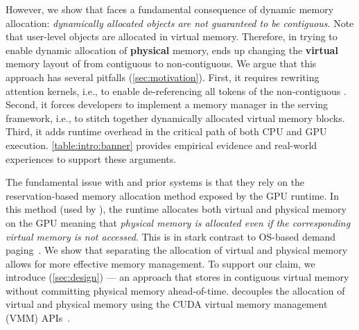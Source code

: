 However, we show that \pa faces a fundamental consequence of dynamic memory allocation: \textit{dynamically allocated objects are not guaranteed to be contiguous}. Note that user-level objects are allocated in virtual memory. Therefore, in trying to enable dynamic allocation of \textbf{physical} memory, \pa ends up changing the \textbf{virtual} memory layout of \kvcache from contiguous to non-contiguous. We argue that this approach has several pitfalls (\autoref{sec:motivation}). First, it requires rewriting attention kernels, i.e., to enable de-referencing all tokens of the non-contiguous \kvcache. Second, it forces developers to implement a memory manager in the serving framework, i.e., to stitch together dynamically allocated virtual memory blocks. Third, it adds runtime overhead in the critical path of both CPU and GPU execution. \autoref{table:intro:banner} provides empirical evidence and real-world experiences to support these arguments.




The fundamental issue with \pa and prior systems is that they rely on the reservation-based memory allocation method exposed by the GPU runtime. In this method (used by \cudamalloc), the runtime allocates both virtual and physical memory on the GPU meaning that \textit{physical memory is allocated even if the corresponding virtual memory is not accessed}. This is in stark contrast to OS-based demand paging~\cite{ingens,hawkeye}. We show that separating the allocation of virtual and physical memory allows for more effective \kvcache memory management. To support our claim, we introduce \sysname (\autoref{sec:design}) --- an approach that stores \kvcache in contiguous virtual memory without committing physical memory ahead-of-time. \sysname decouples the allocation of virtual and physical memory using the CUDA virtual memory management (VMM) APIs~\cite{cudavirtualmemory}.





